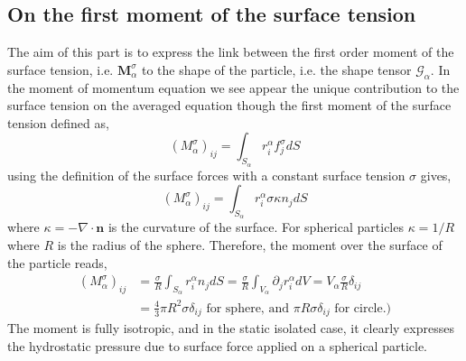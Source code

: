 \subsection{On the first moment of the surface tension}
The aim of this part is to express the link between the first order moment of the surface tension, i.e. $\bm{M}^\sigma_\alpha$ to the shape of the particle, i.e. the shape tensor $\mathcal{G}_\alpha$.
In the moment of momentum equation we see appear the unique contribution to the surface tension on the averaged equation though the first moment of the surface tension defined as,
\begin{equation}
    (M^\sigma_\alpha)_{ij}=\int_{S_\alpha}r^\alpha_i f^\sigma_j dS
\end{equation}
using the definition of the surface forces with a constant surface tension $\sigma$ gives, 
\begin{equation}
    (M^\sigma_\alpha)_{ij}=\int_{S_\alpha}r^\alpha_i \sigma \kappa n_j dS
\end{equation}
where $\kappa = -\nabla \cdot \bm{n}$ is the curvature of the surface. 
For spherical particles $\kappa = 1/R$ where $R$ is the radius of the sphere.
Therefore, the moment over the surface of the particle reads,
\begin{align}
    (M^\sigma_\alpha)_{ij}
    &= \frac{\sigma}{R}\int_{S_\alpha}r^\alpha_i n_j dS
    = \frac{\sigma}{R}\int_{V_\alpha} \partial_j r^\alpha_i dV
    = V_\alpha \frac{\sigma}{R}  \delta_{ij}\\
    &
    = \frac{4}{3} \pi R^2 \sigma  \delta_{ij} 
    \text{ for sphere, and  } 
    \pi R \sigma  \delta_{ij} 
    \text{ for circle.} 
    )
    \label{eq:MtensionCric}
\end{align}
The moment is fully isotropic, and in the static isolated case, it clearly expresses the hydrostatic pressure due to surface force applied on a spherical particle. 

